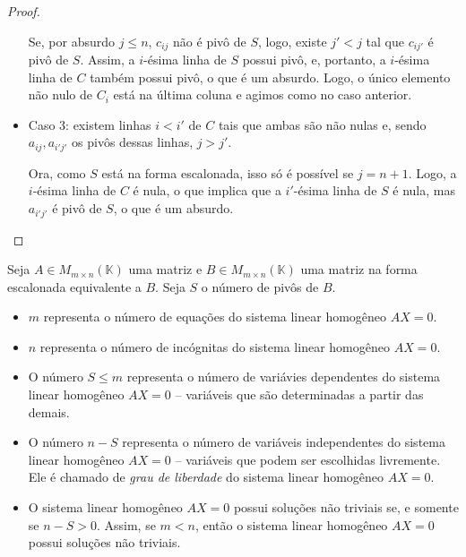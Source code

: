\begin{proof}
\begin{itemize}
    Se, por absurdo $j\leq n$, $c_{ij}$ não é pivô de $S$, logo, existe $j'<j$ tal que $c_{ij'}$ é pivô de $S$.
    Assim, a $i$-ésima linha de $S$ possui pivô, e, portanto, a $i$-ésima linha de $C$ também possui pivô, o que é um absurdo.
    Logo, o único elemento não nulo de $C_i$ está na última coluna e agimos como no caso anterior.
    \item Caso 3: existem linhas $i<i'$ de $C$ tais que ambas são não nulas e, sendo $a_{ij}, a_{i'j'}$ os pivôs dessas linhas, $j>j'$.
    
    Ora, como $S$ está na forma escalonada, isso só é possível se $j=n+1$.
    Logo, a $i$-ésima linha de $C$ é nula, o que implica que a $i'$-ésima linha de $S$ é nula, mas $a_{i'j'}$ é pivô de $S$, o que é um absurdo.
\end{itemize}
\end{proof}
\begin{proposition}
    Seja $A \in M_{m \times n}(\mathbb K)$ uma matriz e $B \in M_{m \times n}(\mathbb K)$ uma matriz na forma escalonada equivalente a $B$.
    Seja $S$ o número de pivôs de $B$.

    \begin{itemize}
        \item $m$ representa o número de equações do sistema linear homogêneo $AX=0$.
        \item $n$ representa o número de incógnitas do sistema linear homogêneo $AX=0$.
        \item O número $S\leq m$ representa o número de variávies dependentes do sistema linear homogêneo $AX=0$ -- variáveis que são determinadas a partir das demais.
        \item O número $n-S$ representa o número de variáveis independentes do sistema linear homogêneo $AX=0$ -- variáveis que podem ser escolhidas livremente. Ele é chamado de \emph{grau de liberdade} do sistema linear homogêneo $AX=0$.
        \item O sistema linear homogêneo $AX=0$ possui soluções não triviais se, e somente se $n-S>0$. Assim, se $m<n$, então o sistema linear homogêneo $AX=0$ possui soluções não triviais.
    \end{itemize}
\end{proposition}